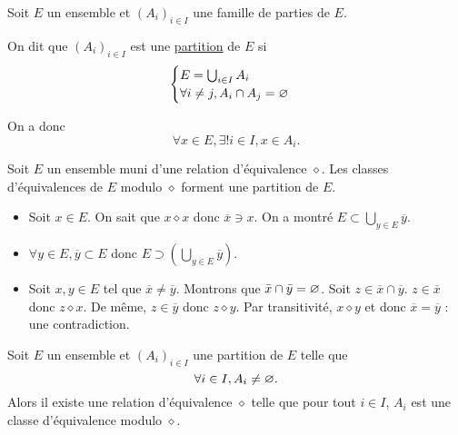 \begin{defn}
	Soit $E$ un ensemble et $(A_i)_{i\in I}$ une famille de parties de $E$.

	On dit que $(A_i)_{i\in I}$ est une \underline{partition} de $E$ si \[
		\begin{cases}
			E = \bigcup_{i \in I} A_i\\
			\forall i \neq j, A_i \cap A_j = \varnothing
		\end{cases}
	\]

	On a donc \[
		\forall x \in E, \exists! i \in I, x \in A_i.
	\]
\end{defn}

\begin{prop}
	Soit $E$ un ensemble muni d'une relation d'équivalence $\diamond$. 
	Les classes d'équivalences de $E$ modulo $\diamond$ forment une partition de $E$.
\end{prop}

\begin{prv}
	\begin{itemize}
		\item Soit $x \in E$. On sait que $x \diamond x$ donc $\overline{x} \ni x$.
			On a montré $E \subset \bigcup_{y \in E} \overline{y}$.
		\item $\forall y \in E, \overline{y} \subset E$ donc $ E \supset \left( \bigcup_{y \in E} \overline{y} \right)$.
		\item Soit $x,y\in E$ tel que $\overline{x} \neq \overline{y}$. Montrons que $\bar{x} \cap \bar{y} = \varnothing$. Soit $z \in \overline{x} \cap \overline{y}$. $z \in \overline{x}$ donc $z\diamond x$. De même, $z \in \overline{y}$ donc $z \diamond y$. Par transitivité, $x\diamond y$ et donc $\overline{x} = \overline{y}$ : une contradiction.
	\end{itemize}
\end{prv}

\begin{prop}
	Soit $E$ un ensemble et $(A_i)_{i\in I}$ une partition de $E$ telle que \[
		\forall i \in I, A_i \neq \varnothing.
	\] Alors il existe une relation d'équivalence $\diamond$ telle que pour tout $i \in I$, $A_i$ est une classe d'équivalence modulo $\diamond$.
\end{prop}

